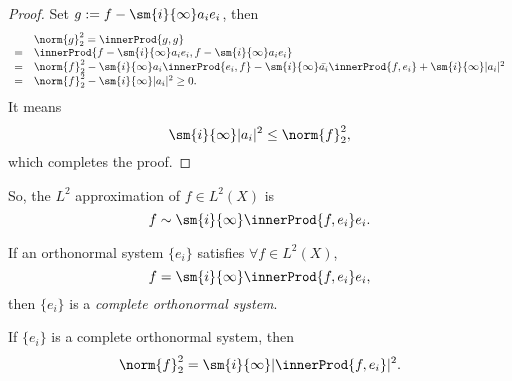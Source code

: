 \begin{proof}
Set $g:=f-\sm{i}{\infty}a_{i}e_{i}$, 
then 
\begin{displaymath}
    \begin{array}{rl}
        &\norm{g}_{2}^{2}=\innerProd{g,g}\\
        =&\innerProd{f-\sm{i}{\infty}a_{i}e_{i},f-\sm{i}{\infty}
        a_{i}e_{i}}\\
        =&\norm{f}_{2}^{2}-\sm{i}{\infty}a_{i}\innerProd{e_{i},f}
        -\sm{i}{\infty}\bar{a_i}\innerProd{f,e_{i}}
        +\sm{i}{\infty}|a_{i}|^{2}\\
        =&\norm{f}_{2}^{2}-\sm{i}{\infty}|a_i|^{2}\ge0.
    \end{array}    
\end{displaymath}
It means 
\begin{displaymath}
    \sm{i}{\infty}|a_i|^{2}\le\norm{f}_{2}^{2},
\end{displaymath}
which completes the proof.
\end{proof}
\begin{rem}
    So, the $L^{2}$ approximation of $f\in L^{2}(X)$ is 
    \begin{displaymath}
        f\sim\sm{i}{\infty}\innerProd{f,e_i}e_i.
    \end{displaymath}
\end{rem}
\begin{defn}
    If an orthonormal system $\{e_{i}\}$ satisfies 
    $\forall f\in L^{2}(X)$, 
    \begin{displaymath}
        f=\sm{i}{\infty}\innerProd{f,e_i}e_{i},
    \end{displaymath}    
    then $\{e_{i}\}$ is a \textit{complete orthonormal system}.
\end{defn}
\begin{thm}
    \label{Thm:Parseval}
    If $\{e_{i}\}$ is a complete orthonormal system, 
    then 
    \begin{displaymath}
        \norm{f}_{2}^{2}=\sm{i}{\infty}|\innerProd{f,e_{i}}|^{2}.
    \end{displaymath}
\end{thm}
